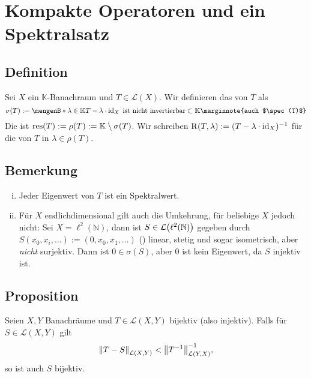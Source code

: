 \section{Kompakte Operatoren und ein Spektralsatz} %
\label{sec:8}

\subsection[Definition: Spektrum eines Bachnachraumes]{Definition} %
\label{sub:81}
Sei $X$ ein $\mathds{K}$-Banachraum und $T \in \mathcal{L}(X)$. Wir definieren das  von $T$ als
\[
	\sigma(T) := \set[\lambda \in \mathds{K}]{T- \lambda \cdot \id_X \text{ ist nicht invertierbar}} \subset \mathds{K} \marginnote{auch $\spec(T)$} 
\]
Die  ist $\res(T) :=  \rho(T) := \mathds{K} \setminus \sigma(T)$. Wir schreiben $\resolv(T,\lambda) := (T- \lambda \cdot \id_X) ^{-1}$ für
die  von $T$ in $\lambda \in \rho(T)$. 

\subsection[Bemerkung zum Zusammenhang von Spektralwerten und Eigenwerten]{Bemerkung} %
\label{sub:82}
\begin{enumerate}[(i)]
	\item Jeder Eigenwert von $T$ ist ein Spektralwert.
	\item Für $X$ endlichdimensional gilt auch die Umkehrung, für beliebige $X$ jedoch nicht: Sei $X=\ell^2(\mathds{N})$, dann ist $S \in \mathcal{L}\enbrace[\big]{\ell^2(\mathds{N})}$
	gegeben durch $S(x_0, x_i, \ldots) := (0,x_0, x_1, \ldots)$ () linear, stetig und sogar isometrisch, aber \emph{nicht} surjektiv. Dann ist
	$0 \in \sigma(S)$, aber $0$ ist kein Eigenwert, da $S$ injektiv ist.
\end{enumerate}

\subsection[Proposition: Bijektivität von Operatoren in einer Umgebung eines bijektiven Operators]{Proposition} %
\label{sub:83}
Seien $X,Y$ Banachräume und $T \in \mathcal{L}(X,Y)$ bijektiv (also injektiv). Falls für $S \in \mathcal{L}(X,Y)$ gilt 
\[
	\norm[\mathcal{L}(X,Y)]{T-S} < \norm[\mathcal{L}(Y,X)]{T^{-1}}^{-1}, 
\]
so ist auch $S$ bijektiv.

